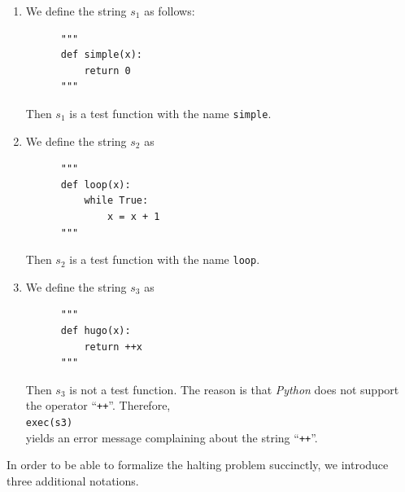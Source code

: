 \examplesEng
\begin{enumerate}
\item We define the string $s_1$ as follows:
      \begin{verbatim}
      """
      def simple(x): 
          return 0
      """
      \end{verbatim}
      \vspace*{-0.8cm}

      Then $s_1$ is a test function with the name \texttt{simple}.
\item We define the string $s_2$ as
      \begin{verbatim}
      """
      def loop(x): 
          while True: 
              x = x + 1
      """
      \end{verbatim}
      \vspace*{-0.8cm}

      Then $s_2$ is a test function with the name \texttt{loop}. 
\item We define the string $s_3$ as
      \begin{verbatim}
      """
      def hugo(x):
          return ++x
      """
      \end{verbatim}
      \vspace*{-0.8cm}

      Then $s_3$ is not a test function.  The reason is that \textsl{Python} does not support the operator
      ``\texttt{++}''.  Therefore, 
      \\[0.2cm]
      \hspace*{1.3cm}
      \texttt{exec(s3)}
      \\[0.2cm]
      yields an error message complaining about the string ``\texttt{++}''.
\end{enumerate}
In order to be able to formalize the halting problem succinctly, we introduce three additional
notations.

